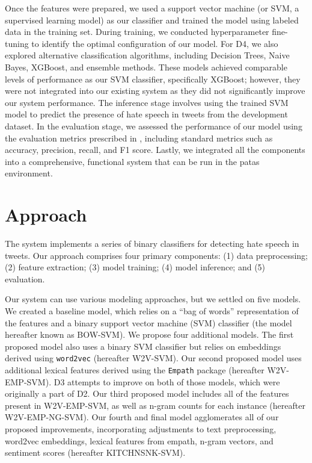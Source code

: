\documentclass[11pt,a4paper]{article}
\begin{document}
   Once the features were prepared, we used a support vector machine (or SVM, a supervised learning model) as our classifier and trained the model using labeled data in the training set. During training, we conducted hyperparameter fine-tuning to identify the optimal configuration of our model. For D4, we also explored alternative classification algorithms, including Decision Trees, Naive Bayes, XGBoost, and ensemble methods. These models achieved comparable levels of performance as our SVM classifier, specifically XGBoost; however, they were not integrated into our existing system as they did not significantly improve our system performance. The inference stage involves using the trained SVM model to predict the presence of hate speech in tweets from the development dataset. In the evaluation stage, we assessed the performance of our model using the evaluation metrics prescribed in \citet{basile-etal-2019-semeval}, including standard metrics such as accuracy, precision, recall, and F1 score. Lastly, we integrated all the components into a comprehensive, functional system that can be run in the patas environment.


\section{Approach}
The system implements a series of binary classifiers for detecting hate speech in tweets. Our approach comprises four primary components: (1) data preprocessing; (2) feature extraction; (3) model training; (4) model inference; and (5) evaluation.

Our system can use various modeling approaches, but we settled on five models. We created a baseline model, which relies on a “bag of words” representation of the features and a binary support vector machine (SVM) classifier (the model hereafter known as BOW-SVM). We propose four additional models. The first proposed model also uses a binary SVM classifier but relies on embeddings derived using \verb|word2vec| (hereafter W2V-SVM). Our second proposed model uses additional lexical features derived using the \verb|Empath| package (hereafter W2V-EMP-SVM). D3 attempts to improve on both of those models, which were originally a part of D2. Our third proposed model includes all of the features present in W2V-EMP-SVM, as well as n-gram counts for each instance (hereafter W2V-EMP-NG-SVM). Our fourth and final model agglomerates all of our proposed improvements, incorporating adjustments to text preprocessing, word2vec embeddings, lexical features from empath, n-gram vectors, and sentiment scores (hereafter KITCHNSNK-SVM).
\end{document}
